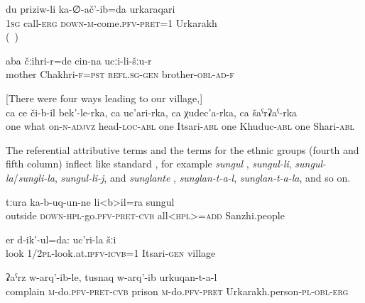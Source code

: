 \begin{exe}
	\ex	\label{ex:I came to Urkarakh by call}
	\gll   	du	priziw-li	ka-∅-ač'-ib=da	urkaraqari\\
		\textsc{1sg}	call-\textsc{erg}	\textsc{down-m}-come.\textsc{pfv-pret}=1	Urkarakh\\
	\glt 	 {} (\tie\ )

	\ex	\label{ex:My mother was in Chakhri, at her brother's place}
	\gll  	aba	čːiħri-r=de	cin-na	ucːi-li-šːu-r\\
		mother	Chakhri-\textsc{f=pst}		\textsc{refl.sg-gen}	brother-\textsc{obl-ad-f}\\
	\glt	{}

	\ex	\label{ex:one through the peak on which there is}[There were four ways leading to our village,]\\
	\gll  	ca	ce	či-b-il	bek'-le-rka,	ca	uc'ari-rka,	ca	χudec'a-rka,		ca	šaˁrʡaˁ-rka\\
		one	what	on-\textsc{n-adjvz}	head-\textsc{loc-abl}	one	Itsari-\textsc{abl}	one	Khuduc-\textsc{abl}	one	Shari-\textsc{abl}\\
	\glt  	{}
\end{exe}

The referential attributive terms and the terms for the ethnic groups (fourth and fifth column) inflect like standard , for example \textit{sungul} ,  \textit{sungul-li},  \textit{sungul-la}\slash\textit{sungli-la},  \textit{sungul-li-j}, and \textit{sunglante} ,  \textit{sunglan-t-a-l},  \textit{sunglan-t-a-la}, and so on.

\begin{exe}
	\ex	\label{ex:All Sanzhi people came out (of their houses)}
	\gll	tːura	ka-b-uq-un-ne	li<b>il=ra	sungul\\
		outside	\textsc{down-hpl}-go.\textsc{pfv-pret-cvb}	all<\textsc{hpl>=add}	Sanzhi.people\\
	\glt  	{}

	\ex	\label{ex:We look: the village of Icari}
	\gll	er d-ik'-ul=da:	uc'ri-la	šːi  \\
		look 1/2\textsc{pl}-look.at.\textsc{ipfv-icvb}=1	Itsari-\textsc{gen}	village\\
	\glt	{}

	\ex	\label{ex:The Urkarakh people complained and put him into prison}
	\gll	ʡaˁrz	w-arq'-ib-le,	tusnaq	w-arq'-ib	urkuqan-t-a-l   \\
		complain	\textsc{m-}do.\textsc{pfv-pret-cvb}	prison	\textsc{m}-do.\textsc{pfv-pret} Urkarakh.person-\textsc{pl-obl-erg}\\
	\glt	{}
\end{exe}

